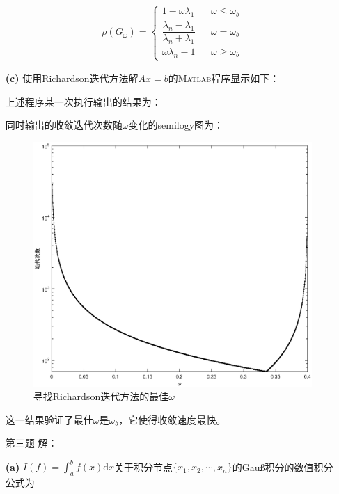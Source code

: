 \documentclass[12pt,a4paper,utf8]{ctexart}
\begin{document}
\begin{enumerate}
\begin{eqnarray}
            \rho(G_\omega)=\left\{
               \begin{array}{rcl}
               1 − \omega \lambda_1 & & {\omega \leq \omega_b}\\
               \dfrac{\lambda_n-\lambda_1}{\lambda_n+\lambda_1} & & {\omega = \omega_b}\\
               \omega \lambda_n-1 & & {\omega \geq \omega_b}
               \end{array} \right.
         \end{eqnarray}
   \item[\textbf{(c)}] 
         使用Richardson迭代方法解$Ax = b$的\textsc{Matlab}程序显示如下：
         
         上述程序某一次执行输出的结果为：
         
         同时输出的收敛迭代次数随$\omega$变化的semilogy图为：
         \begin{figure}[H]
            \centering
            \includegraphics[width=1\textwidth]{fig/p2c.eps}
            \caption{寻找Richardson迭代方法的最佳$\omega$}
         \end{figure}
         这一结果验证了最佳$\omega$是$\omega_b$，它使得收敛速度最快。
   \item[第三题] 解：
   \item[\textbf{(a)}]$I(f)=\int_a^b f(x) \mathrm{d} x$关于积分节点$\{x_1,x_2,\cdots,x_n\}$的Gauß积分的数值积分公式为
   \begin{eqnarray}

\end{eqnarray}
\end{enumerate}
\end{document}

